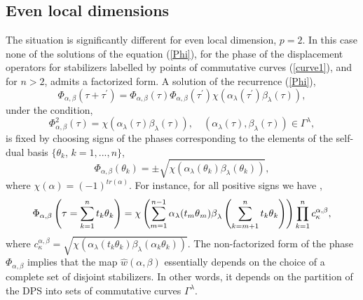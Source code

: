 \documentclass{article}
\begin{document}
\subsection{Even local dimensions}

The situation is significantly different for even local dimension, $p=2$. In
this case none of the solutions of the equation (\ref{Phi}), for the phase
of the displacement operators for stabilizers labelled by points of
commutative curves (\ref{curve1}), and for $n > 2$, admits a factorized form. A
solution of the recurrence (\ref{Phi}),
\begin{equation}
  \Phi_{\alpha,\beta}\left(\tau + \tau^{\prime}\right)
  = \Phi_{\alpha,\beta}(\tau) \Phi_{\alpha,\beta }(\tau^{\prime})
  \chi \left(
    \alpha_{\lambda }(\tau^{\prime}) \beta_{\lambda}(\tau)
  \right),
  \label{phase 2}
\end{equation}
under the condition,
\begin{equation*}
  \Phi_{\alpha,\beta}^{2}(\tau)
  = \chi \left(
    \alpha_{\lambda}(\tau) \beta_{\lambda}(\tau )
  \right),
  \quad \left(\alpha_{\lambda}(\tau), \beta_{\lambda}(\tau)\right)
  \in \Gamma^{\lambda},
\end{equation*}
is fixed by choosing signs of the phases corresponding to the elements of
the self-dual basis $\{\theta _{k}$, $k=1,...,n\}$, 
\begin{equation}
\Phi _{\alpha ,\beta }(\theta _{k})=\pm \sqrt{\chi \left( \alpha _{\lambda
}(\theta _{k})\beta _{\lambda }(\theta _{k})\right) },
\label{Phib}
\end{equation}
where $\chi(\alpha) = (-1)^{tr(\alpha)}$. For instance, for all positive signs
we have \cite{klimov06},
\begin{equation}
  \Phi_{\alpha,\beta }\left(
    \tau = \sum\limits_{k=1}^{n} t_{k}\theta_{k}
  \right)
  = \chi\left(
    \sum\limits_{m=1}^{n-1}
    \alpha_{\lambda}(t_{m}\theta_{m})\beta_{\lambda}
    \left(\sum\limits_{k=m+1}^{n}t_{k}\theta_{k}\right)
  \right)
  \dprod\limits_{k=1}^{n} c_{\kappa }^{\alpha,\beta},
  \label{Phi G}
\end{equation}
where $c_{\kappa}^{\alpha,\beta} =
\sqrt{\chi\left(\alpha_{\lambda}(t_{k}\theta_{k})
\beta_{\lambda}\left(\alpha_{k} \theta_{k}\right)\right)}$. The non-factorized
form of the phase $\Phi_{\alpha,\beta}$ implies that the map
$\hat{w}(\alpha,\beta)$ essentially depends on the
choice of a complete set of disjoint stabilizers. In other words, it depends
on the partition of the DPS into sets of commutative curves $\Gamma^{\lambda}$.
\end{document}
